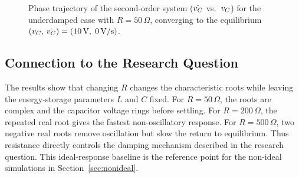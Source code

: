 \begin{figure}[htbp]
  \centering
  \caption{Phase trajectory of the second-order system ($\dot{v_C}$ vs.\ $v_C$)
           for the underdamped case with $R = 50\,\Omega$, converging to the
           equilibrium $(v_C,\,\dot{v_C}) = (10\,\text{V},\;0\,\text{V/s})$.}
  \label{fig:phase}
\end{figure}

\subsection{Connection to the Research Question}

The results show that changing $R$ changes the characteristic roots while
leaving the energy-storage parameters $L$ and $C$ fixed. For
$R=50\,\Omega$, the roots are complex and the capacitor voltage rings
before settling. For $R=200\,\Omega$, the repeated real root gives the
fastest non-oscillatory response. For $R=500\,\Omega$, two negative real
roots remove oscillation but slow the return to equilibrium. Thus resistance
directly controls the damping mechanism described in the research question.
This ideal-response baseline is the reference point for the non-ideal
simulations in Section~\ref{sec:nonideal}.
